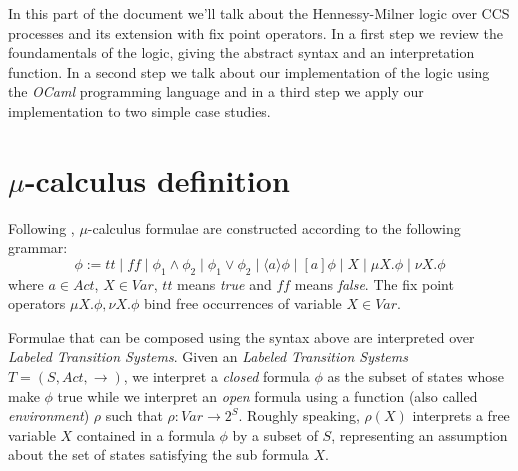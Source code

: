 In this part of the document we'll talk about the Hennessy-Milner
logic over CCS processes and its extension with fix point
operators. In a first step we review the foundamentals of the logic,
giving the abstract syntax and an interpretation function. In a second
step we talk about our implementation of the logic using the
\emph{OCaml} programming language and in a third step we apply our
implementation to two simple case studies.

\section{$\mu$-calculus definition}
Following \cite{MuScSt1999}, $\mu$-calculus formulae are constructed
according to the following grammar:
\begin{displaymath}
  \phi := tt \mid ff \mid \phi_1 \wedge \phi_2 \mid \phi_1 \vee \phi_2 \mid
  \langle a \rangle \phi \mid [a]\phi \mid X \mid \mu X.\phi
  \mid \nu X.\phi
\end{displaymath}
where $a \in Act$, $X \in Var$, $tt$ means \emph{true} and $ff$ means
\emph{false}. The fix point operators $\mu X.\phi, \nu X.\phi$ bind
free occurrences of variable $X \in Var$.

Formulae that can be composed using the syntax above are interpreted
over \emph{Labeled Transition Systems}. Given an \emph{Labeled
  Transition Systems} $T = (S, Act, \rightarrow)$, we interpret a
\emph{closed} formula $\phi$ as the subset of states whose make $\phi$
true while we interpret an \emph{open} formula using a function (also
called \emph{environment}) $\rho$ such that $\rho: Var \rightarrow
2^S$. Roughly speaking, $\rho(X)$ interprets a free variable $X$
contained in a formula $\phi$ by a subset of $S$, representing an
assumption about the set of states satisfying the sub formula $X$.

